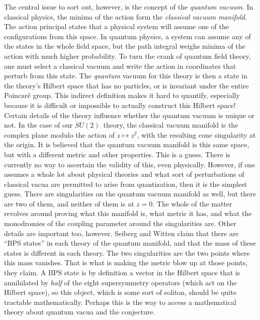 \documentclass[twoside]{amsart}
\newcommand{\enm}[1]{\ensuremath{#1}}
\newcommand{\sut}{\enm{SU(2)}}
\begin{document}
The central issue to sort out, however, is the concept of the
\emph{quantum vacuum}.  In classical physics, the minima of the action
form the \emph{classical vacuum manifold}.  The action principal
states that a physical system will assume one of the configurations
from this space.  In quantum physics, a system can assume any of the
states in the whole field space, but the path integral weighs minima
of the action with much higher probability.  To turn the crank of
quantum field theory, one must select a classical vacuum and write the
action in coordinates that perturb from this state.  The
\emph{quantum} vacuum for this theory is then a state in the theory's
Hilbert space that has no particles, or is invariant under the entire
Poincar\'e group.  This indirect definition makes it hard to quantify,
especially because it is difficult or impossible to actually construct
this Hilbert space!  Certain details of the theory influence whether
the quantum vacuum is unique or not.  In the case of our \sut\ theory,
the classical vacuum manifold is the complex plane modulo the action
of \( z\mapsto z^2 \), with the resulting cone singularity at the
origin.  It is believed that the quantum vacuum manifold is this same
space, but with a different metric and other properties.  This is a
guess.  There is currently no way to ascertain the validity of this,
even physically.  However, if one assumes a whole lot about physical
theories and what sort of perturbations of classical vacua are
permitted to arise from quantization, then it is the simplest guess.
There are singularities on the quantum vacuum manifold as well, but
there are two of them, and neither of them is at \( z=0.  \) The whole
of the matter revolves around proving what this manifold is, what
metric it has, and what the monodromies of the coupling parameter
around the singularities are.  Other details are important too,
however.  Seiberg and Witten claim that there are ``BPS states'' in
each theory of the quantum manifold, and that the mass of these states
is different in each theory.  The two singularities are the two points
where this mass vanishes.  That is what is making the metric blow up
at those points, they claim.  A BPS state is by definition a vector in
the Hilbert space that is annihilated by \emph{half} of the eight
supersymmetry operators (which act on the Hilbert space), so this
object, which is some sort of soliton, should be quite tractable
mathematically.  Perhaps this is the way to access a mathematical
theory about quantum vacua and the conjecture.
\end{document}
